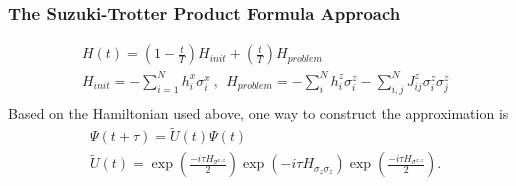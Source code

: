 \documentclass{beamer}
\begin{document}
\begin{frame}
	\frametitle{The Suzuki-Trotter Product Formula Approach}
	\begin{equation*}
		\begin{split}
		&H(t)=(1-\frac{t}{T} )H_{init}+(\frac{t}{T})H_{problem} \\
		&H_{init}= -\sum_{i=1}^{N}h_i^x \sigma_i^x ~,~~ H_{problem}= -\sum_{i}^N h_i^z \sigma^z_i - \sum_{i,j}^N J_{ij}^z \sigma^z_i \sigma^z_j\\
		\end{split}
	\end{equation*} 
	Based on the Hamiltonian used above, one way to construct the approximation is 
	\begin{equation*}
	\label{tilde_U}
	\begin{split}
	&\Psi(t+\tau) =\tilde{U}(t)\Psi(t)\\
	&\tilde{U}(t) = \exp(\frac{-i\tau H_{\sigma^{x,z}}}{2})\exp(-i\tau H_{\sigma_z \sigma_z})\exp(\frac{-i\tau H_{\sigma^{x,z}}}{2}).
	\end{split}
	\end{equation*}

\end{frame}
%
\end{document}
